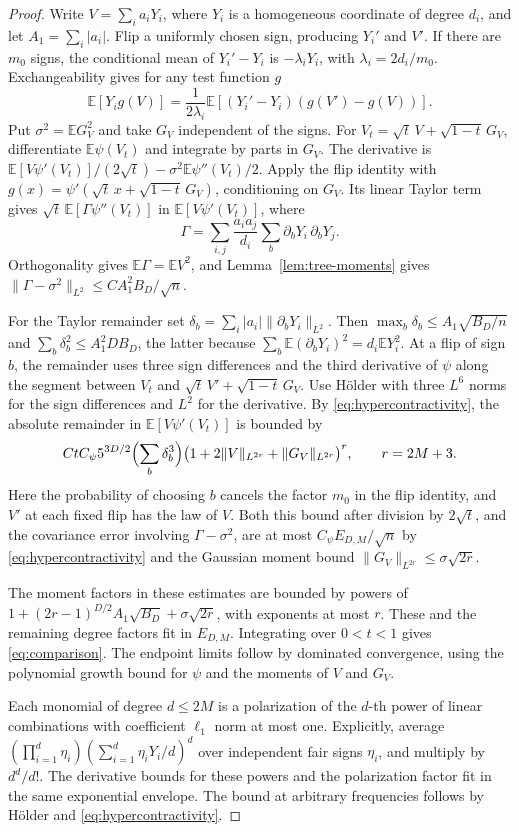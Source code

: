 \documentclass[preprints,article,submit,oneauthor]{Definitions/mdpi}
\newcommand{\E}{\mathbb E}
\newcommand{\abs}[1]{\lvert #1\rvert}
\newcommand{\norm}[1]{\lVert #1\rVert}
\begin{document}
\begin{proof}
Write \(V=\sum_i a_iY_i\), where \(Y_i\) is a homogeneous coordinate of
degree \(d_i\), and let \(A_1=\sum_i\abs{a_i}\). Flip a uniformly chosen
sign, producing \(Y_i'\) and \(V'\). If there are \(m_0\) signs, the
conditional mean of \(Y_i'-Y_i\) is \(-\lambda_iY_i\), with
\(\lambda_i=2d_i/m_0\). Exchangeability gives for any test function \(g\)
\[
 \E[Y_i g(V)]=\frac{1}{2\lambda_i}
       \E[(Y_i'-Y_i)(g(V')-g(V))].
\]
Put \(\sigma^2=\E G_V^2\) and take \(G_V\) independent of the signs.
For \(V_t=\sqrt t\,V+\sqrt{1-t}\,G_V\), differentiate
\(\E \psi(V_t)\) and integrate by parts in \(G_V\). The derivative is
\(\E[V \psi'(V_t)]/(2\sqrt t)-\sigma^2\E \psi''(V_t)/2\).
Apply the flip identity with \(g(x)=\psi'(\sqrt t\,x+\sqrt{1-t}\,G_V)\),
conditioning on \(G_V\). Its linear Taylor term gives
\(\sqrt t\,\E[\Gamma \psi''(V_t)]\) in \(\E[V\psi'(V_t)]\), where
\[
 \Gamma=\sum_{i,j}\frac{a_i a_j}{d_i}
                  \sum_b\partial_bY_i\,\partial_bY_j.
\]
Orthogonality gives \(\E\Gamma=\E V^2\), and Lemma~\ref{lem:tree-moments}
gives \(\norm{\Gamma-\sigma^2}_{L^2}\le C A_1^2 B_D/\sqrt n\).

For the Taylor remainder set \(\delta_b=\sum_i\abs{a_i}\norm{\partial_bY_i}_{L^2}\).
Then \(\max_b \delta_b\le A_1\sqrt{B_D/n}\) and
\(\sum_b \delta_b^2\le A_1^2 D B_D\), the latter because
\(\sum_b\E(\partial_bY_i)^2=d_i\E Y_i^2\).
At a flip of sign \(b\), the remainder uses three sign differences
and the third derivative of \(\psi\) along the segment between
\(V_t\) and \(\sqrt t\,V'+\sqrt{1-t}\,G_V\).
Use H\"older with three \(L^6\) norms for the sign differences and
\(L^2\) for the derivative. By \eqref{eq:hypercontractivity}, the
absolute remainder in \(\E[V\psi'(V_t)]\) is bounded by
\[
 C t C_\psi 5^{3D/2}\Bigl(\sum_b \delta_b^3\Bigr)
     \bigl(1+2\norm V_{L^{2r}}+\norm{G_V}_{L^{2r}}\bigr)^r,
 \qquad r=2M+3.
\]
Here the probability of choosing \(b\) cancels the factor \(m_0\) in
the flip identity, and \(V'\) at each fixed flip has the law of \(V\).
Both this bound after division by \(2\sqrt t\), and the covariance
error involving \(\Gamma-\sigma^2\), are at most \(C_\psi E_{D,M}/\sqrt n\)
by \eqref{eq:hypercontractivity} and the Gaussian moment bound
\(\norm{G_V}_{L^{2r}}\le\sigma\sqrt{2r}\).

The moment factors in these estimates are bounded by powers of
\(1+(2r-1)^{D/2}A_1\sqrt{B_D}+\sigma\sqrt{2r}\), with exponents at
most \(r\). These and the remaining degree factors fit in \(E_{D,M}\).
Integrating over \(0<t<1\) gives \eqref{eq:comparison}. The endpoint
limits follow by dominated convergence, using the polynomial growth
bound for \(\psi\) and the moments of \(V\) and \(G_V\).

Each monomial of degree \(d\le 2M\) is a polarization of the \(d\)-th
power of linear combinations with coefficient \(\ell_1\) norm at
most one. Explicitly, average
\((\prod_{i=1}^d\eta_i)(\sum_{i=1}^d\eta_iY_i/d)^d\) over independent
fair signs \(\eta_i\), and multiply by \(d^d/d!\). The derivative
bounds for these powers and the polarization factor fit in the
same exponential envelope. The bound at arbitrary frequencies
follows by H\"older and \eqref{eq:hypercontractivity}.
\end{proof}
\end{document}
